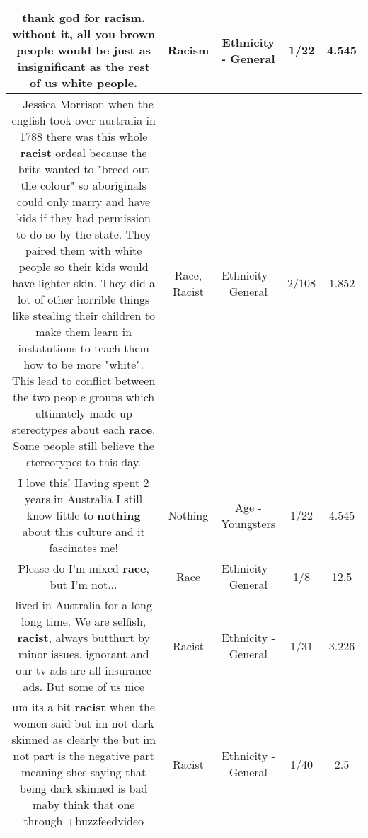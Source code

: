 \documentclass[11pt]{article}
\newlength\mylength
\begin{document}
\begin{center}
\begin{longtable}{|C{.65\mylength}|C{.30\mylength}|C{.12\mylength}|C{.12\mylength}|C{.12\mylength}|}
  \small thank god for \textbf{racism}. without it, all you brown people would be just as insignificant as the rest of us white people.\normalsize   & Racism & Ethnicity - General & 1/22 & 4.545 \\  \hline
  \small +Jessica Morrison when the english took over australia in 1788 there was this whole \textbf{racist} ordeal because the brits wanted to "breed out the colour" so aboriginals could only marry and have kids if they had permission to do so by the state. They paired them with white people so their kids would have lighter skin. They did a lot of other horrible things like stealing their children to make them learn in instatutions  to teach them how to be more "white". This lead to conflict between the two people groups which ultimately made up stereotypes about each \textbf{race}. Some people still believe the stereotypes to this day.\normalsize   & Race, Racist & Ethnicity - General & 2/108 & 1.852 \\  \hline
  \small I love this! Having spent 2 years in Australia I still know little to \textbf{nothing} about this culture and it fascinates me!\normalsize   & Nothing & Age - Youngsters & 1/22 & 4.545 \\  \hline
  \small Please do I'm mixed \textbf{race}, but I'm not...\normalsize   & Race & Ethnicity - General & 1/8 & 12.5 \\  \hline
  \small lived in Australia for a long long time. We are selfish, \textbf{racist}, always butthurt by minor issues, ignorant and our tv ads are all insurance ads. But some of us nice\normalsize   & Racist & Ethnicity - General & 1/31 & 3.226 \\  \hline
  \small um its a bit \textbf{racist} when the women said but im not dark skinned as clearly the but im not part is the negative part meaning shes saying that being dark skinned is bad maby think that one through +buzzfeedvideo\normalsize   & Racist & Ethnicity - General & 1/40 & 2.5 \\  \hline

\end{longtable}
\end{center}
\end{document}
